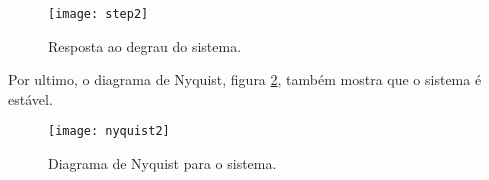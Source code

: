 \begin{figure}[H]
    \centering
    \caption{Resposta ao degrau do sistema.}
    \texttt{[image: step2]}
    \label{fig:step2}
\end{figure}

Por ultimo, o diagrama de Nyquist, figura \ref{fig:nyquist2}, também mostra que o sistema é estável.

\begin{figure}[H]
    \centering
    \caption{Diagrama de Nyquist para o sistema.}
    \texttt{[image: nyquist2]}
    \label{fig:nyquist2}
\end{figure}

